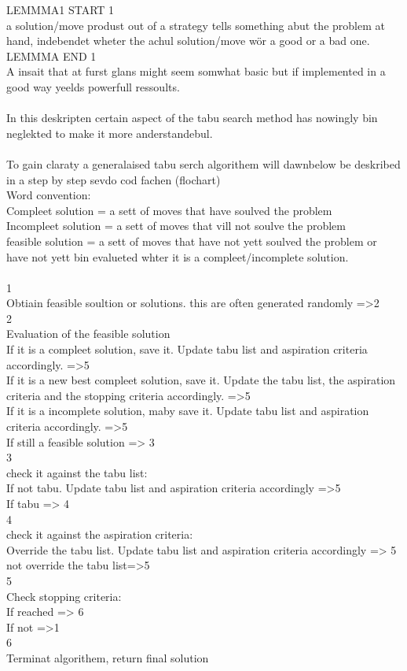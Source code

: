 LEMMMA1 START 1\\
a solution/move produst out of a strategy tells something abut the problem at hand, indebendet wheter the achul solution/move wör a good or a bad one.\\
LEMMMA END 1\\

A insait that at furst glans might seem somwhat basic but if implemented in a good way yeelds powerfull ressoults.\\
\\
In this deskripten certain aspect of the tabu search method has nowingly bin neglekted to make it more anderstandebul.\\
 \\
To gain claraty a generalaised tabu serch algorithem will dawnbelow be deskribed in a step by step sevdo cod fachen (flochart)\\

Word convention:\\ 
Compleet solution = a sett of moves that have soulved the problem\\
Incompleet solution = a sett of moves that vill not soulve the problem\\
feasible solution = a sett of moves that have not yett soulved the problem or have not yett bin evalueted whter it is a compleet/incomplete solution.\\

\\
1\\
Obtiain feasible soultion or solutions. this are often generated randomly  =>2\\
2\\
Evaluation of the feasible solution\\
If it is a compleet solution, save it. Update tabu list and aspiration criteria accordingly. =>5\\
If it is a new best compleet solution, save it. Update  the tabu list, the aspiration criteria and the stopping criteria accordingly. =>5\\
If it is a incomplete solution, maby save it. Update tabu list and aspiration criteria accordingly. =>5\\
If still a feasible solution => 3\\
3\\
check it against the tabu list:\\
If not tabu. Update tabu list and aspiration criteria accordingly =>5\\
If tabu => 4\\
4\\
check it against the aspiration criteria:\\
Override the tabu list. Update tabu list and aspiration criteria accordingly => 5\\
not override the tabu list=>5\\
5\\
Check stopping criteria:\\
If reached => 6\\
If not =>1\\
6\\
Terminat algorithem, return final solution\\



